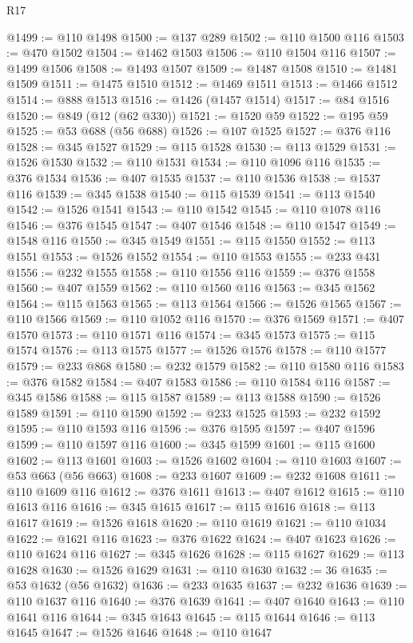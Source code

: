 \begin{lexlean}{R17}
\begin{coremodule}
{{{{{{{{{{{{{{{{{{{{{{{{{{{{{{{{{{{{{{{{{{{{{{{{{{{{{{{{{{{{{{{{{{{{{{{{{{{{{{{{{{{{{@1499 := @110 @1498
@1500 := @137 @289
@1502 := @110 @1500 @116
@1503 := @470 @1502
@1504 := @1462 @1503
@1506 := @110 @1504 @116
@1507 := @1499 @1506
@1508 := @1493 @1507
@1509 := @1487 @1508
@1510 := @1481 @1509
@1511 := @1475 @1510
@1512 := @1469 @1511
@1513 := @1466 @1512
@1514 := @888 @1513
@1516 := @1426 (@1457 @1514)
@1517 := @84 @1516
@1520 := @849 (@12 (@62 @330))
@1521 := @1520 @59
@1522 := @195 @59
@1525 := @53 @688 (@56 @688)
@1526 := @107 @1525
@1527 := @376 @116
@1528 := @345 @1527
@1529 := @115 @1528
@1530 := @113 @1529
@1531 := @1526 @1530
@1532 := @110 @1531
@1534 := @110 @1096 @116
@1535 := @376 @1534
@1536 := @407 @1535
@1537 := @110 @1536
@1538 := @1537 @116
@1539 := @345 @1538
@1540 := @115 @1539
@1541 := @113 @1540
@1542 := @1526 @1541
@1543 := @110 @1542
@1545 := @110 @1078 @116
@1546 := @376 @1545
@1547 := @407 @1546
@1548 := @110 @1547
@1549 := @1548 @116
@1550 := @345 @1549
@1551 := @115 @1550
@1552 := @113 @1551
@1553 := @1526 @1552
@1554 := @110 @1553
@1555 := @233 @431
@1556 := @232 @1555
@1558 := @110 @1556 @116
@1559 := @376 @1558
@1560 := @407 @1559
@1562 := @110 @1560 @116
@1563 := @345 @1562
@1564 := @115 @1563
@1565 := @113 @1564
@1566 := @1526 @1565
@1567 := @110 @1566
@1569 := @110 @1052 @116
@1570 := @376 @1569
@1571 := @407 @1570
@1573 := @110 @1571 @116
@1574 := @345 @1573
@1575 := @115 @1574
@1576 := @113 @1575
@1577 := @1526 @1576
@1578 := @110 @1577
@1579 := @233 @868
@1580 := @232 @1579
@1582 := @110 @1580 @116
@1583 := @376 @1582
@1584 := @407 @1583
@1586 := @110 @1584 @116
@1587 := @345 @1586
@1588 := @115 @1587
@1589 := @113 @1588
@1590 := @1526 @1589
@1591 := @110 @1590
@1592 := @233 @1525
@1593 := @232 @1592
@1595 := @110 @1593 @116
@1596 := @376 @1595
@1597 := @407 @1596
@1599 := @110 @1597 @116
@1600 := @345 @1599
@1601 := @115 @1600
@1602 := @113 @1601
@1603 := @1526 @1602
@1604 := @110 @1603
@1607 := @53 @663 (@56 @663)
@1608 := @233 @1607
@1609 := @232 @1608
@1611 := @110 @1609 @116
@1612 := @376 @1611
@1613 := @407 @1612
@1615 := @110 @1613 @116
@1616 := @345 @1615
@1617 := @115 @1616
@1618 := @113 @1617
@1619 := @1526 @1618
@1620 := @110 @1619
@1621 := @110 @1034
@1622 := @1621 @116
@1623 := @376 @1622
@1624 := @407 @1623
@1626 := @110 @1624 @116
@1627 := @345 @1626
@1628 := @115 @1627
@1629 := @113 @1628
@1630 := @1526 @1629
@1631 := @110 @1630
@1632 := 36
@1635 := @53 @1632 (@56 @1632)
@1636 := @233 @1635
@1637 := @232 @1636
@1639 := @110 @1637 @116
@1640 := @376 @1639
@1641 := @407 @1640
@1643 := @110 @1641 @116
@1644 := @345 @1643
@1645 := @115 @1644
@1646 := @113 @1645
@1647 := @1526 @1646
@1648 := @110 @1647
}}}}}}}}}}}}}}}}}}}}}}}}}}}}}}}}}}}}}}}}}}}}}}}}}}}}}}}}}}}}}}}}}}}}}}}}}}}}}}}}}}}}}
\end{coremodule}
\end{lexlean}
